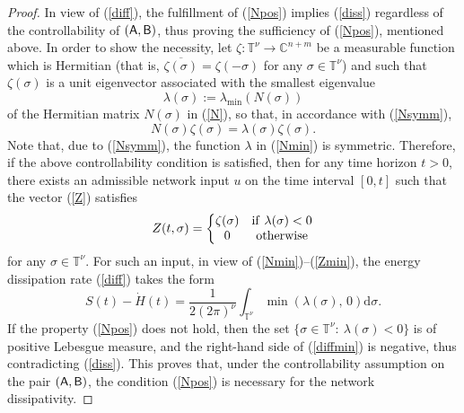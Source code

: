 \documentclass[letterpaper, 10pt, conference]{ieeeconf}  %
\def\mC{\mathbb{C}}    %
\def\rd{\mathrm{d}}        %
\def\sA{\mathsf{A}}
\def\sB{\mathsf{B}}
\def\sB{{\sf B}}
\def\mT{\mathbb{T}}
\begin{document}
\begin{proof}
In view of (\ref{diff}), the fulfillment of (\ref{Npos}) implies (\ref{diss}) regardless of the controllability of $(\sA,\sB)$, thus proving the sufficiency of (\ref{Npos}), mentioned above. In order to show the necessity, let $\zeta: \mT^\nu\to \mC^{n+m}$ be a measurable  function which is Hermitian (that is, $\overline{\zeta(\sigma)} = \zeta(-\sigma)$ for any $\sigma\in \mT^\nu$) and such that $\zeta(\sigma)$ is a unit eigenvector
associated with the smallest eigenvalue
\begin{equation}
\label{Nmin}
    \lambda(\sigma)
    :=
    \lambda_{\min}(N(\sigma))
\end{equation}
of the Hermitian  matrix $N(\sigma)$ in (\ref{N}), so that, in accordance with (\ref{Nsymm}),
\begin{equation}
\label{zeta}
  N(\sigma)\zeta(\sigma) = \lambda(\sigma)\zeta(\sigma).
\end{equation}
Note that, due to (\ref{Nsymm}), the function $\lambda$ in (\ref{Nmin}) is symmetric.
Therefore, if the above controllability condition is satisfied, then for any time horizon $t>0$, there exists an admissible  network input $u$ on the time interval $[0,t]$ such that the vector (\ref{Z}) satisfies
\begin{equation}
\label{Zmin}
    Z(t,\sigma)
    =
    \left\{
    \begin{matrix}
    \zeta(\sigma) & {\rm if}\ \lambda(\sigma)<0\\
    0 & {\rm otherwise}
    \end{matrix}
    \right.
\end{equation}
for any $\sigma \in \mT^\nu$.
For such an input, in view of (\ref{Nmin})--(\ref{Zmin}), the energy dissipation rate (\ref{diff}) takes the form
\begin{equation}
\label{diffmin}
    S(t) - \dot{H}(t)
    =
    \frac{1}
    {2(2\pi)^{\nu}}
    \int_{\mT^\nu}
    \min(\lambda(\sigma),\, 0)
    \rd \sigma.
\end{equation}
If the property (\ref{Npos}) does not hold, then the set $\{\sigma \in \mT^\nu:\ \lambda(\sigma)<0\}$ is of positive Lebesgue measure, and the right-hand side of (\ref{diffmin})  is negative, thus contradicting (\ref{diss}). This proves that, under the controllability assumption on the pair $(\sA,\sB)$, the condition (\ref{Npos}) is necessary for the network dissipativity.
%
%
\end{proof}
\end{document}

